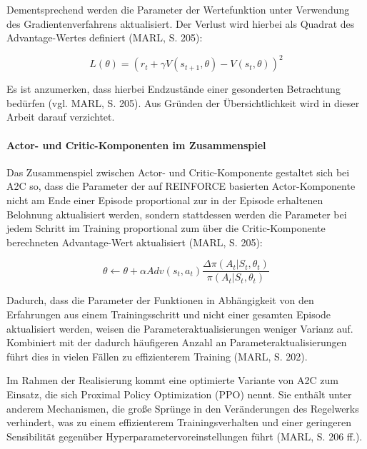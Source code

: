Dementsprechend werden die Parameter der Wertefunktion unter Verwendung des Gradientenverfahrens aktualisiert. Der Verlust wird hierbei als Quadrat des Advantage-Wertes definiert (MARL, S. 205):

\[ L(\theta) = (r_t + \gamma V(s_{t+1}, \theta) - V(s_t, \theta))^2 \]

Es ist anzumerken, dass hierbei Endzustände einer gesonderten Betrachtung bedürfen (vgl. MARL, S. 205). Aus Gründen der Übersichtlichkeit wird in dieser Arbeit darauf verzichtet.

\paragraph{Actor- und Critic-Komponenten im Zusammenspiel}

Das Zusammenspiel zwischen Actor- und Critic-Komponente gestaltet sich bei A2C so, dass die Parameter der auf REINFORCE basierten Actor-Komponente nicht am Ende einer Episode proportional zur in der Episode erhaltenen Belohnung aktualisiert werden, sondern stattdessen werden die Parameter bei jedem Schritt im Training proportional zum über die Critic-Komponente berechneten Advantage-Wert aktualisiert (MARL, S. 205):

\[ \theta \leftarrow \theta + \alpha Adv(s_t, a_t) \frac{\Delta \pi (A_t|S_t, \theta_t)}{\pi (A_t|S_t, \theta_t)} \]

Dadurch, dass die Parameter der Funktionen in Abhängigkeit von den Erfahrungen aus einem Trainingsschritt und nicht einer gesamten Episode aktualisiert werden, weisen die Parameteraktualisierungen weniger Varianz auf. Kombiniert mit der dadurch häufigeren Anzahl an Parameteraktualisierungen führt dies in vielen Fällen zu effizienterem Training (MARL, S. 202).

Im Rahmen der Realisierung kommt eine optimierte Variante von A2C zum Einsatz, die sich Proximal Policy Optimization (PPO) nennt. Sie enthält unter anderem Mechanismen, die große Sprünge in den Veränderungen des Regelwerks verhindert, was zu einem effizienterem Trainingsverhalten und einer geringeren Sensibilität gegenüber Hyperparametervoreinstellungen führt (MARL, S. 206 ff.).
